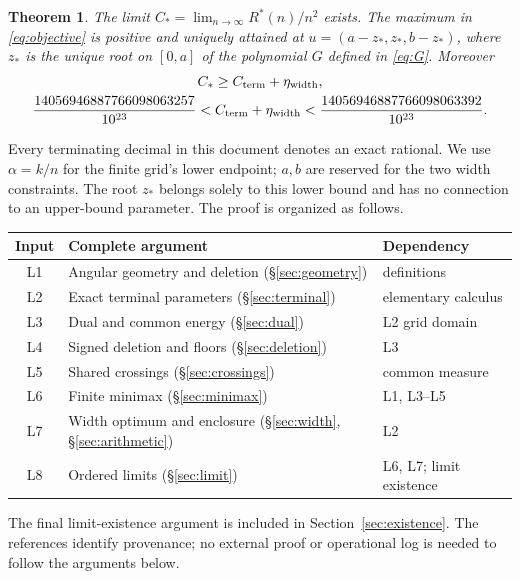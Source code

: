 \documentclass[11pt,a4paper]{article}
\newtheorem{theorem}{Theorem}[section]
\theoremstyle{remark}\newtheorem{remark}[theorem]{Remark}
\newcommand{\Rstar}{R^*}
\newcommand{\Cterm}{C_{\rm term}}
\newcommand{\etaw}{\eta_{\rm width}}
\begin{document}
\begin{theorem}\label{thm:main}
The limit $C_*=\lim_{n\to\infty}\Rstar(n)/n^2$ exists. The maximum
in \eqref{eq:objective} is positive and uniquely attained at
$u=(a-z_*,z_*,b-z_*)$, where $z_*$ is the unique root on $[0,a]$ of
the polynomial $G$ defined in \eqref{eq:G}. Moreover
\begin{equation}\label{eq:mainbound}
\begin{gathered}
C_*\ge\Cterm+\etaw,\\
\frac{14056946887766098063257}{10^{23}}
<\Cterm+\etaw<
\frac{14056946887766098063392}{10^{23}}.
\end{gathered}
\end{equation}
\end{theorem}

Every terminating decimal in this document denotes an exact rational.
We use $\alpha=k/n$ for the finite grid's lower endpoint; $a,b$ are
reserved for the two width constraints. The root $z_*$ belongs solely
to this lower bound and has no connection to an upper-bound parameter.
The proof is organized as follows.

\begin{center}\small
\begin{tabular}{@{}cll@{}}\toprule
Input & Complete argument & Dependency\\\midrule
L1 & Angular geometry and deletion (\S\ref{sec:geometry}) & definitions\\
L2 & Exact terminal parameters (\S\ref{sec:terminal}) & elementary calculus\\
L3 & Dual and common energy (\S\ref{sec:dual}) & L2 grid domain\\
L4 & Signed deletion and floors (\S\ref{sec:deletion}) & L3\\
L5 & Shared crossings (\S\ref{sec:crossings}) & common measure\\
L6 & Finite minimax (\S\ref{sec:minimax}) & L1, L3--L5\\
L7 & Width optimum and enclosure (\S\ref{sec:width}, \S\ref{sec:arithmetic}) & L2\\
L8 & Ordered limits (\S\ref{sec:limit}) & L6, L7; limit existence\\\bottomrule
\end{tabular}
\end{center}
The final limit-existence argument is included in Section~\ref{sec:existence}.
The references identify provenance; no external proof or operational log is
needed to follow the arguments below.
\end{document}
